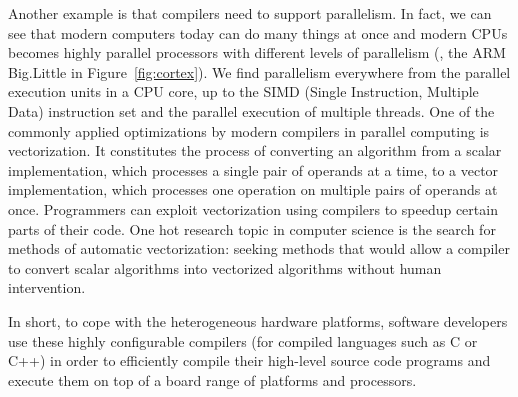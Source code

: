 Another example is that compilers need to support parallelism. In fact, we can see that modern computers today can do many things at once and modern CPUs becomes highly parallel processors with different levels of parallelism (\eg, the ARM Big.Little in Figure~\ref{fig:cortex}). We find parallelism everywhere from the parallel execution units in a CPU core, up to the SIMD (Single Instruction, Multiple Data) instruction set and the parallel execution of multiple threads.  One of the commonly applied optimizations by modern compilers in parallel computing is vectorization. It constitutes the process of converting an algorithm from a scalar implementation, which processes a single pair of operands at a time, to a vector implementation, which processes one operation on multiple pairs of operands at once.
Programmers can exploit vectorization using compilers to speedup certain parts of their code. One hot research topic in computer science is the search for methods of automatic vectorization\cite{nuzman2006auto}: seeking methods that would allow a compiler to convert scalar algorithms into vectorized algorithms without human intervention.


In short, to cope with the heterogeneous hardware platforms, software developers use these highly configurable compilers (for compiled languages such as C or C++) in order to efficiently compile their high-level source code programs and execute them on top of a board range of platforms and processors. 


